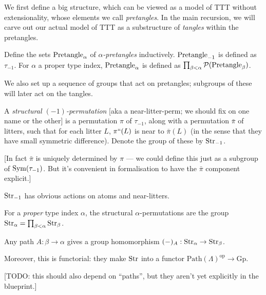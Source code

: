 We first define a big structure, which can be viewed as a model of TTT without extensionality, whose elements we call \emph{pretangles}.  In the main recursion, we will carve out our actual model of TTT as a substructure of \emph{tangles} within the pretangles.

\begin{definition}
  \label{def:pretangle}
  \leanok
  Define the sets $\mathrm{Pretangle}_\alpha$ of \emph{$\alpha$-pretangles} inductively. $\mathrm{Pretangle}_{-1}$ is defined as $\tau_{-1}$. For $\alpha$ a proper type index, $\mathrm{Pretangle}_\alpha$ is defined as $\prod_{\beta < \alpha} \mathcal{P}(\mathrm{Pretangle}_\beta)$.
\end{definition}

We also set up a sequence of groups that act on pretangles; subgroups of these will later act on the tangles.

\begin{definition}
  \label{def:structural-perm-atoms}
  \leanok

  A \emph{structural $(-1)$-permutation} [aka a near-litter-perm; we should fix on one name or the other] is a permutation $\pi$ of $\tau_{-1}$, along with a permutation $\bar{\pi}$ of litters, such that for each litter $L$, $\pi``(L)$ is near to $\bar{\pi}(L)$ (in the sense that they have small symmetric difference).  Denote the group of these by $\mathrm{Str}_{-1}$.

  [In fact $\bar{\pi}$ is uniquely determined by $\pi$ — we could define this just as a subgroup of $\mathrm{Sym}(\tau_{-1})$.  But it’s convenient in formalisation to have the $\bar{\pi}$ component explicit.]

  $\mathrm{Str}_{-1}$ has obvious actions on atoms and near-litters.
\end{definition}

\begin{definition}
  \label{def:structural-perm}
  \leanok
  For a \emph{proper} type index $\alpha$, the structural $\alpha$-permutations are the group $\mathrm{Str}_\alpha = \prod_{\beta < \alpha} \mathrm{Str}_\beta$.
\end{definition}

\begin{definition}
  \label{def:structural-perm-derivative}
  \leanok
  Any path $A : \beta \to \alpha$ gives a group homomorphism $(-)_A : \mathrm{Str}_\alpha \to \mathrm{Str}_\beta$.

  Moreover, this is functorial: they make $\mathrm{Str}$ into a functor $\mathrm{Path}(\Lambda)^\mathrm{op} \to \mathrm{Gp}$.

  [TODO: this should also depend on “paths”, but they aren’t yet explicitly in the blueprint.]
\end{definition}


